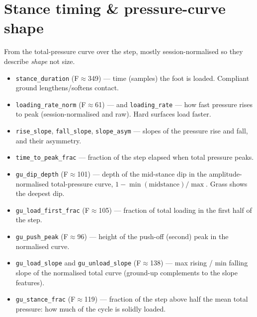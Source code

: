 \documentclass[11pt]{article}
\begin{document}
\section{Stance timing \& pressure-curve shape}
From the total-pressure curve over the step, mostly session-normalised so they describe
\emph{shape} not size.
\begin{itemize}
\item \texttt{stance\_duration} (F$\approx$349) --- time (samples) the foot is loaded. Compliant ground lengthens/softens contact.
\item \texttt{loading\_rate\_norm} (F$\approx$61) --- and \texttt{loading\_rate} --- how fast pressure rises to peak (session-normalised and raw). Hard surfaces load faster.
\item \texttt{rise\_slope}, \texttt{fall\_slope}, \texttt{slope\_asym} --- slopes of the pressure rise and fall, and their asymmetry.
\item \texttt{time\_to\_peak\_frac} --- fraction of the step elapsed when total pressure peaks.
\item \texttt{gu\_dip\_depth} (F$\approx$101) --- depth of the mid-stance dip in the amplitude-normalised total-pressure curve, $1-\min(\text{midstance})/\max$. Grass shows the deepest dip.
\item \texttt{gu\_load\_first\_frac} (F$\approx$105) --- fraction of total loading in the first half of the step.
\item \texttt{gu\_push\_peak} (F$\approx$96) --- height of the push-off (second) peak in the normalised curve.
\item \texttt{gu\_load\_slope} and \texttt{gu\_unload\_slope} (F$\approx$138) --- max rising / min falling slope of the normalised total curve (ground-up complements to the slope features).
\item \texttt{gu\_stance\_frac} (F$\approx$119) --- fraction of the step above half the mean total pressure: how much of the cycle is solidly loaded.
\end{itemize}
\end{document}
